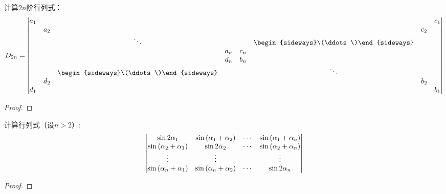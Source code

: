\begin{problem}
计算\(2n\)阶行列式：
\begin{equation*}
    D_{2n}=
    \begin{vmatrix}
        a_1 &     &                                          &     &     &                                          &     & c_1 \\
            & a_2 &                                          &     &     &                                          & c_2 &     \\
            &     & \ddots                                   &     &     & \begin{sideways}\(\ddots\)\end{sideways} &     &     \\
            &     &                                          & a_n & c_n &                                          &     &     \\
            &     &                                          & d_n & b_n &                                          &     &     \\
            &     & \begin{sideways}\(\ddots\)\end{sideways} &     &     & \ddots                                   &     &     \\
            & d_2 &                                          &     &     &                                          & b_2 &     \\
        d_1 &     &                                          &     &     &                                          &     & b_1
    \end{vmatrix}
\end{equation*}
\end{problem}
\begin{proof}
\end{proof}

\begin{problem}
计算行列式（设\(n>2\)）:
\begin{equation*}
    \begin{vmatrix}
        \sin 2\alpha_1                    & \sin\left( \alpha_{1}+\alpha_{2} \right) & \cdots & \sin\left( \alpha_{1}+\alpha_{n} \right) \\
        \sin\left( \alpha_{2}+\alpha_{1} \right) & \sin 2\alpha_2                    & \cdots & \sin\left( \alpha_{2}+\alpha_{n} \right) \\
        \vdots                            & \vdots                            &        & \vdots                            \\
        \sin\left( \alpha_{n}+\alpha_{1} \right) & \sin\left( \alpha_{n}+\alpha_{2} \right) & \cdots & \sin 2\alpha_n
    \end{vmatrix}
\end{equation*}
\end{problem}
\begin{proof}
\end{proof}

